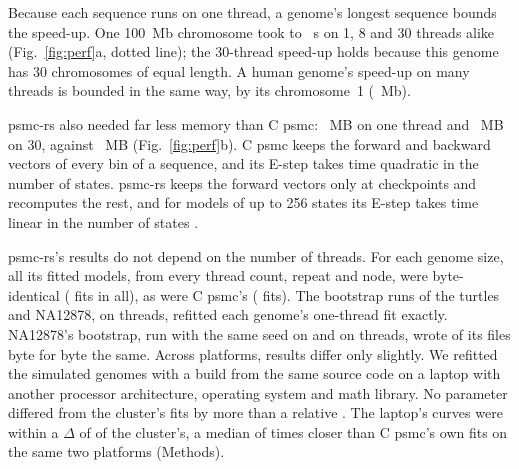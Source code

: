 \documentclass[11pt]{article}
\newcommand{\psmcrs}{psmc-rs}
\begin{document}
\begin{table}[tbp]
\centering\small
\caption{\textbf{Run time and memory of C psmc and \psmcrs{} (E3).} Median wall time of 25 EM iterations over \EthreeRepeatsW{} repeats on exclusive \EthreeCpu{} nodes, for simulated constant-size genomes of 100~Mb chromosomes; speed-up over C psmc (a ratio of unrounded medians) and peak memory (median, MB of $2^{20}$ bytes) on \EthreeBigMb{}~Mb. -- marks a setup not timed.}
\label{tab:timing}

\end{table}

Because each sequence runs on one thread, a genome's longest sequence bounds the speed-up. One 100~Mb chromosome took \EthreeChromWallMin{} to \EthreeChromWallMax{}~s on 1, 8 and 30 threads alike (Fig.~\ref{fig:perf}a, dotted line); the 30-thread speed-up holds because this genome has 30 chromosomes of equal length. A human genome's speed-up on many threads is bounded in the same way, by its chromosome~1 (\EsevenLongestMb{}~Mb).

\psmcrs{} also needed far less memory than C psmc: \EthreeRsMemOne{}~MB on one thread and \EthreeRsMemThirty{}~MB on 30, against \EthreeCMem{}~MB (Fig.~\ref{fig:perf}b). C psmc keeps the forward and backward vectors of every bin of a sequence, and its E-step takes time quadratic in the number of states. \psmcrs{} keeps the forward vectors only at checkpoints and recomputes the rest, and for models of up to 256 states its E-step takes time linear in the number of states \citep[Methods;][]{harris2014}.

\psmcrs{}'s results do not depend on the number of threads. For each genome size, all its fitted models, from every thread count, repeat and node, were byte-identical (\EthreeDetRsTotal{} fits in all), as were C psmc's (\EthreeDetCTotal{} fits). The bootstrap runs of the turtles and NA12878, on \EtwoBootThreads{} threads, refitted each genome's one-thread fit exactly. NA12878's bootstrap, run with the same seed on \EtwoBootThreads{} and on \EsevenBootThreads{} threads, wrote \EsevenBootFilesIdentical{} of its \EsevenBootFiles{} files byte for byte the same. Across platforms, results differ only slightly. We refitted the \EoneGenomes{} simulated genomes with a build from the same source code on a laptop with another processor architecture, operating system and math library. No parameter differed from the cluster's fits by more than a relative \XpParamRelMax{}. The laptop's curves were within a $\Delta$ of \XpRsRmseMax{} of the cluster's, a median of \XpRatioCMedian{} times closer than C psmc's own fits on the same two platforms (Methods).
\end{document}
